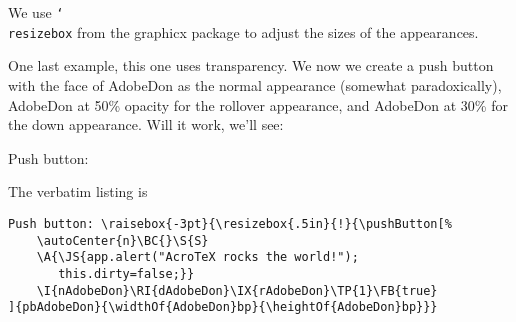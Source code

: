 \documentclass{article}
\newcommand{\cs}[1]{\texttt{\char`\\#1}}
\begin{document}
We use \cs{resizebox} from the \textsf{graphicx} package to adjust
the sizes of the appearances.

\newpage


One last example, this one uses transparency. We now we create a push
button with the face of AdobeDon as the normal appearance (somewhat
paradoxically), AdobeDon at 50\% opacity for the rollover
appearance, and AdobeDon at 30\% for the down appearance. Will it
work, we'll see:\medskip

Push button: 


\medskip The verbatim listing is
\begin{small}
\begin{verbatim}
Push button: \raisebox{-3pt}{\resizebox{.5in}{!}{\pushButton[%
    \autoCenter{n}\BC{}\S{S}
    \A{\JS{app.alert("AcroTeX rocks the world!");
       this.dirty=false;}}
    \I{nAdobeDon}\RI{dAdobeDon}\IX{rAdobeDon}\TP{1}\FB{true}
]{pbAdobeDon}{\widthOf{AdobeDon}bp}{\heightOf{AdobeDon}bp}}}
\end{verbatim}
\end{small}
\end{document}
